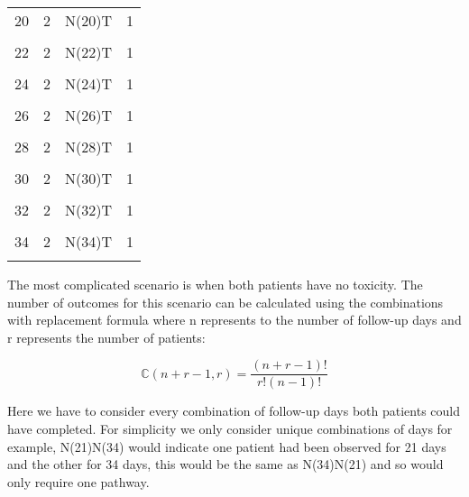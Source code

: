 \begin{table}[H]
{\begin{tabular}[t]{cccc}
			20 & 2 & N(20)T & 1\\
			\cellcolor{gray!6}{21} & \cellcolor{gray!6}{2} & \cellcolor{gray!6}{N(21)T} & \cellcolor{gray!6}{1}\\
			22 & 2 & N(22)T & 1\\
			\cellcolor{gray!6}{23} & \cellcolor{gray!6}{2} & \cellcolor{gray!6}{N(23)T} & \cellcolor{gray!6}{1}\\
			24 & 2 & N(24)T & 1\\
			\cellcolor{gray!6}{25} & \cellcolor{gray!6}{2} & \cellcolor{gray!6}{N(25)T} & \cellcolor{gray!6}{1}\\
			26 & 2 & N(26)T & 1\\
			\cellcolor{gray!6}{27} & \cellcolor{gray!6}{2} & \cellcolor{gray!6}{N(27)T} & \cellcolor{gray!6}{1}\\
			28 & 2 & N(28)T & 1\\
			\cellcolor{gray!6}{29} & \cellcolor{gray!6}{2} & \cellcolor{gray!6}{N(29)T} & \cellcolor{gray!6}{1}\\
			30 & 2 & N(30)T & 1\\
			\cellcolor{gray!6}{31} & \cellcolor{gray!6}{2} & \cellcolor{gray!6}{N(31)T} & \cellcolor{gray!6}{1}\\
			32 & 2 & N(32)T & 1\\
			\cellcolor{gray!6}{33} & \cellcolor{gray!6}{2} & \cellcolor{gray!6}{N(33)T} & \cellcolor{gray!6}{1}\\
			34 & 2 & N(34)T & 1\\
			\cellcolor{gray!6}{35} & \cellcolor{gray!6}{2} & \cellcolor{gray!6}{NT} & \cellcolor{gray!6}{1}\\
			\bottomrule
	\end{tabular}}
\end{table}

The most complicated scenario is when both patients have no toxicity. The number of outcomes for this scenario can be calculated using the combinations with replacement formula where n represents to the number of follow-up days and r represents the number of patients: 

\begin{equation}
	\mathbb{C}(n+r-1,r) = \frac{(n+r-1)!}{r!(n-1)!}
\end{equation}

Here we have to consider every combination of follow-up days both patients could have completed. For simplicity we only consider unique combinations of days for example, N(21)N(34) would indicate one patient had been observed for 21 days and the other for 34 days, this would be the same as N(34)N(21) and so would only require one pathway. 

